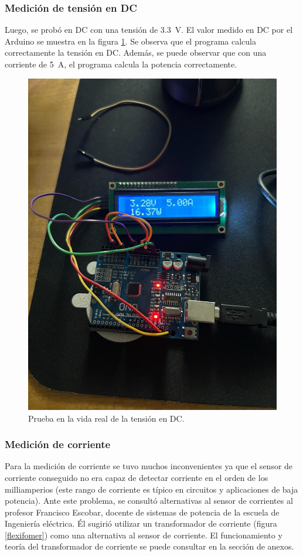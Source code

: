 \subsubsection{Medición de tensión en DC}
Luego, se probó en DC con una tensión de \SI{3.3}{\volt}. El valor medido en DC por el Arduino se muestra en la figura \ref{voltage-low-dc}. Se observa que el programa calcula correctamente la tensión en DC. Además, se puede observar que con una corriente de \SI{5}{\ampere}, el programa calcula la potencia correctamente.
\begin{figure}[h]
    \centering
    \includegraphics[width=12cm]{Imagenes/Tension_DC.jpg}
    \caption{Prueba en la vida real de la tensión en DC.}
    \label{voltage-low-dc}
\end{figure}
\FloatBarrier
\subsubsection{Medición de corriente}
Para la medición de corriente se tuvo muchos inconvenientes ya que el sensor de corriente conseguido no era capaz de detectar corriente en el orden de los milliamperios (este rango de corriente es típico en circuitos y aplicaciones de baja potencia). Ante este problema, se consultó alternativas al sensor de corrientes al profesor Francisco Escobar, docente de sistemas de potencia de la escuela de Ingeniería eléctrica. Él sugirió utilizar un transformador de corriente (figura \ref{flexifomer}) como una alternativa al sensor de corriente. El funcionamiento y teoría del transformador de corriente se puede consultar en la sección de anexos.


